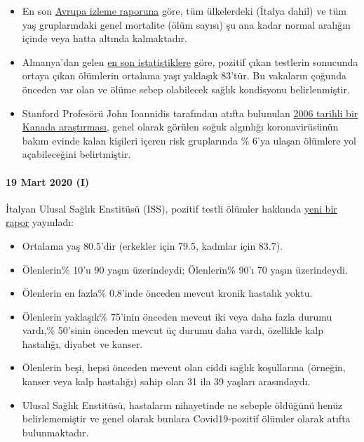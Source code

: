 \begin{itemize}
\tightlist
\item
  En son \href{https://www.euromomo.eu/index.html}{Avrupa izleme
  raporuna} göre, tüm ülkelerdeki (İtalya dahil) ve tüm yaş
  gruplarındaki genel mortalite (ölüm sayısı) şu ana kadar normal
  aralığın içinde veya hatta altında kalmaktadır.
\item
  Almanya'dan gelen
  \href{https://de.wikipedia.org/wiki/COVID-19-Pandemie_in_Deutschland\#Todesf\%C3\%A4lle_in_den_Medien}{en
  son istatistiklere} göre, pozitif çıkan testlerin sonucunda ortaya
  çıkan ölümlerin ortalama yaşı yaklaşık 83'tür. Bu vakaların çoğunda
  önceden var olan ve ölüme sebep olabilecek sağlık kondisyonu
  belirlenmiştir.
\item
  Stanford Profesörü John Ioannidis tarafından atıfta bulunulan
  \href{https://www.ncbi.nlm.nih.gov/pmc/articles/PMC2095096/}{2006
  tarihli bir Kanada araştırması}, genel olarak görülen soğuk algınlığı
  koronavirüsünün bakım evinde kalan kişileri içeren risk gruplarında \%
  6'ya ulaşan ölümlere yol açabileceğini belirtmiştir. 
\end{itemize}

\hypertarget{19-mart-2020-i}{%
\paragraph{19 Mart 2020 (I)}\label{19-mart-2020-i}}

İtalyan Ulusal Sağlık Enstitüsü (ISS), pozitif testli ölümler hakkında
\href{https://www.epicentro.iss.it/coronavirus/bollettino/Report-COVID-2019_17_marzo-v2.pdf}{yeni
bir rapor} yayınladı:

\begin{itemize}
\tightlist
\item
  Ortalama yaş 80.5'dir (erkekler için 79.5, kadınlar için 83.7).
\item
  Ölenlerin\% 10'u 90 yaşın üzerindeydi; Ölenlerin\% 90'ı 70 yaşın
  üzerindeydi.
\item
  Ölenlerin en fazla\% 0.8'inde önceden mevcut kronik hastalık yoktu.
\item
  Ölenlerin yaklaşık\% 75'inin önceden mevcut iki veya daha fazla durumu
  vardı,\% 50'sinin önceden mevcut üç durumu daha vardı, özellikle kalp
  hastalığı, diyabet ve kanser.
\item
  Ölenlerin beşi, hepsi önceden mevcut olan ciddi sağlık koşullarına
  (örneğin, kanser veya kalp hastalığı) sahip olan 31 ila 39 yaşları
  arasındaydı.
\item
  Ulusal Sağlık Enstitüsü, hastaların nihayetinde ne sebeple öldüğünü
  henüz belirlememiştir ve genel olarak bunlara Covid19-pozitif ölümler
  olarak atıfta bulunmaktadır.
\end{itemize}

